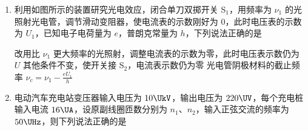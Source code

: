 \documentclass[\gkver]{gaokaozhenti}
\begin{document}
\begin{enumerate}
{BC．当 $x = 20 \Ucm$ 时，该装置所测的温度最高，代入解得 $t_{\max} = 31.5 \UdC$

故该装置所测温度不高于 $31.5 \UdC$，当 $x = 0$ 时，该装置所测的温度最低，代入解得 $t_{\min} = 22.5 \UdC$

故该装置所测温度不低于 $22.5 \UdC$，故 B 正确，C 错误；

D．其他条件不变，缓慢把吸管拉出来一点，由盖-吕萨克定律可知，油柱离罐口距离不变，故 D 错误。

故选 B。
}

\item
利用如图所示的装置研究光电效应，闭合单刀双掷开关 S$_{1}$，用频率为 $\nu_{1}$ 的光照射光电管，调节滑动变阻器，使电流表的示数刚好为 0，此时电压表的示数为 $U_{1}$，已知电子电荷量为 $e$，普朗克常量为 $h$，下列说法正确的是


{改用比 $\nu_{1}$ 更大频率的光照射，调整电流表的示数为零，此时电压表示数仍为 $U$}
{其他条件不变，使开关接 S$_{2}$，电流表示数仍为零}
{光电管阴极材料的截止频率 $\nu_{c} = \nu_{1} - \frac{eU_{1}}{h}$}


\item
电动汽车充电站变压器输入电压为 $10 \UkV$，输出电压为 $220 \UV$，每个充电桩输入电流 $16 \UA$，设原副线圈匝数分别为 $n_{1}$、$n_{2}$，输入正弦交流的频率为 $50 \UHz$，则下列说法正确的是


\end{enumerate}
\end{document}
